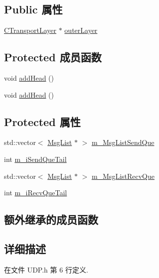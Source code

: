 \subsection*{Public 属性}
\begin{DoxyCompactItemize}
\item 
\hyperlink{class_c_transport_layer}{C\+Transport\+Layer} $\ast$ \hyperlink{class_c_u_d_p_a4c0a9bc6c679d857a3461a3a71ba8abd}{outer\+Layer}
\end{DoxyCompactItemize}
\subsection*{Protected 成员函数}
\begin{DoxyCompactItemize}
\item 
void \hyperlink{class_c_u_d_p_a445c3b7fe1b58e8b278115649ad25c3f}{add\+Head} ()
\item 
void \hyperlink{class_c_u_d_p_a445c3b7fe1b58e8b278115649ad25c3f}{add\+Head} ()
\end{DoxyCompactItemize}
\subsection*{Protected 属性}
\begin{DoxyCompactItemize}
\item 
std\+::vector$<$ \hyperlink{class_msg_list}{Msg\+List} $\ast$ $>$ \hyperlink{class_c_u_d_p_adc6c3097ec9ab885987b058ef3b1e26f}{m\+\_\+\+Msg\+List\+Send\+Que}
\item 
int \hyperlink{class_c_u_d_p_acf38f880b4ccfbff285aeaff75a931a4}{m\+\_\+i\+Send\+Que\+Tail}
\item 
std\+::vector$<$ \hyperlink{class_msg_list}{Msg\+List} $\ast$ $>$ \hyperlink{class_c_u_d_p_ae04cfd9b77ae1d4f96d83e890a1203f3}{m\+\_\+\+Msg\+List\+Recv\+Que}
\item 
int \hyperlink{class_c_u_d_p_ae90f37aa5c56ecf05cf6e4daacd90bba}{m\+\_\+i\+Recv\+Que\+Tail}
\end{DoxyCompactItemize}
\subsection*{额外继承的成员函数}


\subsection{详细描述}


在文件 U\+D\+P.\+h 第 6 行定义.



